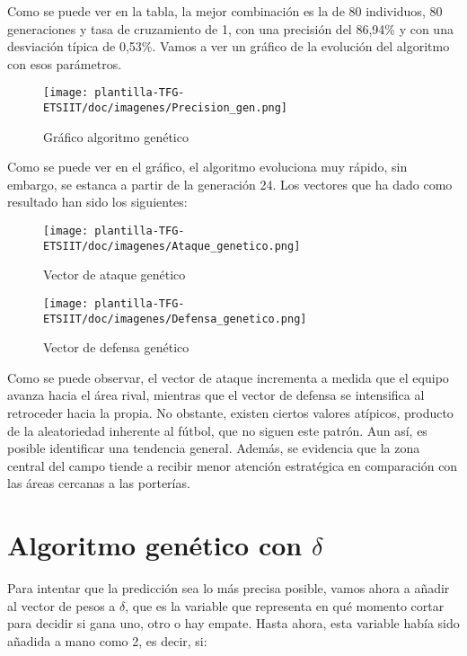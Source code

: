 Como se puede ver en la tabla, la mejor combinación es la de 80 individuos, 80 generaciones y tasa de cruzamiento de 1, con una precisión del 86,94\% y con una desviación típica de 0,53\%. Vamos a ver un gráfico de la evolución del algoritmo con esos parámetros.

\begin{figure}[H]
    \centering
    \texttt{[image: plantilla-TFG-ETSIIT/doc/imagenes/Precision\_gen.png]}
    \caption{Gráfico algoritmo genético}
    \label{fig:etiqueta-imagen}
\end{figure}

Como se puede ver en el gráfico, el algoritmo evoluciona muy rápido, sin embargo, se estanca a partir de la generación 24. Los vectores que ha dado como resultado han sido los siguientes:

\begin{figure}[H]
    \centering
    \texttt{[image: plantilla-TFG-ETSIIT/doc/imagenes/Ataque\_genetico.png]}
    \caption{Vector de ataque genético}
    \label{fig:etiqueta-imagen}
\end{figure}

\begin{figure}[H]
    \centering
    \texttt{[image: plantilla-TFG-ETSIIT/doc/imagenes/Defensa\_genetico.png]}
    \caption{Vector de defensa genético}
    \label{fig:etiqueta-imagen}
\end{figure}

Como se puede observar, el vector de ataque incrementa a medida que el equipo avanza hacia el área rival, mientras que el vector de defensa se intensifica al retroceder hacia la propia. No obstante, existen ciertos valores atípicos, producto de la aleatoriedad inherente al fútbol, que no siguen este patrón. Aun así, es posible identificar una tendencia general. Además, se evidencia que la zona central del campo tiende a recibir menor atención estratégica en comparación con las áreas cercanas a las porterías.

\section{Algoritmo genético con $\delta$}
Para intentar que la predicción sea lo más precisa posible, vamos ahora a añadir al vector de pesos a $\delta$, que es la variable que representa en qué momento cortar para decidir si gana uno, otro o hay empate. Hasta ahora, esta variable había sido añadida a mano como 2, es decir, si:

